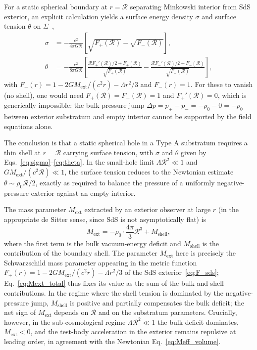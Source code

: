 \documentclass[%
  reprint,
  superscriptaddress,
  showpacs,
  showkeys,
  amsmath,amssymb,
  pra,
  longbibliography,
  floatfix,
  x11names
]{revtex4-2}
\begin{document}
For a static spherical boundary at $r = \mathcal{R}$ separating Minkowski interior from SdS exterior, an explicit calculation yields a surface energy density $\sigma$ and surface tension $\theta$ on $\Sigma$~\cite{poisson-2004,visser-1995},
\begin{align}
\sigma &= -\frac{c^2}{4\pi G \mathcal{R}}\left[\sqrt{F_+(\mathcal{R})} - \sqrt{F_-(\mathcal{R})}\right],
\label{eq:sigma}\\
\theta &= -\frac{c^2}{8\pi G \mathcal{R}}\left[\frac{\mathcal{R} F_+'(\mathcal{R})/2 + F_+(\mathcal{R})}{\sqrt{F_+(\mathcal{R})}} - \frac{\mathcal{R} F_-'(\mathcal{R})/2 + F_-(\mathcal{R})}{\sqrt{F_-(\mathcal{R})}}\right],
\label{eq:theta}
\end{align}
with $F_+(r) = 1 - 2GM_{\mathrm{ext}}/(c^2 r) - \Lambda r^2/3$ and $F_-(r) = 1$. For these to vanish (no shell), one would need $F_+(\mathcal{R}) = F_-(\mathcal{R}) = 1$ and $F_+'(\mathcal{R}) = 0$, which is generically impossible: the bulk pressure jump $\Delta p = p_+ - p_- = -\rho_0 - 0 = -\rho_0$ between exterior substratum and empty interior cannot be supported by the field equations alone.

The conclusion is that a static spherical hole in a Type A substratum requires a thin shell at $r = \mathcal{R}$ carrying surface tension, with $\sigma$ and $\theta$ given by Eqs.~\eqref{eq:sigma}--\eqref{eq:theta}. In the small-hole limit $\Lambda \mathcal{R}^2 \ll 1$ and $GM_{\mathrm{ext}}/(c^2 \mathcal{R}) \ll 1$, the surface tension reduces to the Newtonian estimate $\theta \sim \rho_0 \mathcal{R}/2$, exactly as required to balance the pressure of a uniformly negative-pressure exterior against an empty interior.

The mass parameter $M_{\mathrm{ext}}$ extracted by an exterior observer at large $r$ (in the appropriate de Sitter sense, since SdS is not asymptotically flat) is
\begin{equation}
M_{\mathrm{ext}} = -\rho_0 \cdot \frac{4\pi}{3} \mathcal{R}^3 + M_{\mathrm{shell}},
\label{eq:Mext_total}
\end{equation}
where the first term is the bulk vacuum-energy deficit and $M_{\mathrm{shell}}$ is the contribution of the boundary shell. The parameter $M_{\mathrm{ext}}$ here is precisely the Schwarzschild mass parameter appearing in the metric function $F_+(r) = 1 - 2GM_{\mathrm{ext}}/(c^2 r) - \Lambda r^2/3$ of the SdS exterior~\eqref{eq:F_sds}; Eq.~\eqref{eq:Mext_total} thus fixes its value as the sum of the bulk and shell contributions. In the regime where the shell tension is dominated by the negative-pressure jump, $M_{\mathrm{shell}}$ is positive and partially compensates the bulk deficit; the net sign of $M_{\mathrm{ext}}$ depends on $\mathcal{R}$ and on the substratum parameters. Crucially, however, in the sub-cosmological regime $\Lambda \mathcal{R}^2 \ll 1$ the bulk deficit dominates, $M_{\mathrm{ext}} < 0$, and the test-body acceleration in the exterior remains repulsive at leading order, in agreement with the Newtonian Eq.~\eqref{eq:Meff_volume}.
\end{document}
